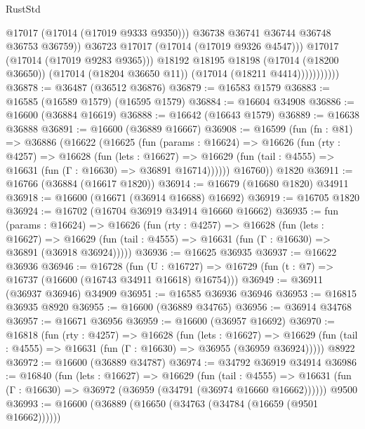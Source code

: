 \begin{lexlean}{RustStd}
\begin{coremodule}
{\begin{coremodule}
{{{{{{{{{{{{{{{{{{{{{{{{{{{{{{{{{{{{{{{{{{{{{{{{{{{{{{{                                @17017
                                (@17014 (@17019 @9333 @9350)))
                              @36738
                              @36741
                              @36744
                              @36748
                              @36753
                              @36759))
                          @36723
                          @17017
                          (@17014 (@17019 @9326 @4547)))
                        @17017
                        (@17014 (@17019 @9283 @9365)))
                      @18192
                      @18195
                      @18198
                      (@17014 (@18200 @36650))
                      (@17014 (@18204 @36650 @11))
                      (@17014 (@18211 @4414)))))))))))
@36878 := @36487 (@36512 @36876)
@36879 := @16583 @1579
@36883 := @16585 (@16589 @1579) (@16595 @1579)
@36884 := @16604 @34908
@36886 := @16600 (@36884 @16619)
@36888 := @16642 (@16643 @1579)
@36889 := @16638 @36888
@36891 := @16600 (@36889 @16667)
@36908 := @16599
    (fun (fn : @81) =>
    @36886
      (@16622
        (@16625
          (fun (params : @16624) =>
          @16626
            (fun (rty : @4257) =>
            @16628
              (fun (lets : @16627) =>
              @16629 (fun (tail : @4555) => @16631 (fun (Γ : @16630) => @36891 @16714))))))
        @16760))
    @1820
@36911 := @16766 (@36884 (@16617 @1820))
@36914 := @16679 (@16680 @1820) @34911
@36918 := @16600 (@16671 (@36914 @16688) @16692)
@36919 := @16705 @1820
@36924 := @16702 (@16704 @36919 @34914 @16660 @16662)
@36935 := fun (params : @16624) =>
  @16626
    (fun (rty : @4257) =>
    @16628
      (fun (lets : @16627) =>
      @16629 (fun (tail : @4555) => @16631 (fun (Γ : @16630) => @36891 (@36918 @36924)))))
@36936 := @16625 @36935
@36937 := @16622 @36936
@36946 := @16728
    (fun (U : @16727) => @16729 (fun (t : @7) => @16737 (@16600 (@16743 @34911 @16618) @16754)))
@36949 := @36911 (@36937 @36946) @34909
@36951 := @16585 @36936 @36946
@36953 := @16815 @36935 @8920
@36955 := @16600 (@36889 @34765)
@36956 := @36914 @34768
@36957 := @16671 @36956
@36959 := @16600 (@36957 @16692)
@36970 := @16818
    (fun (rty : @4257) =>
    @16628
      (fun (lets : @16627) =>
      @16629 (fun (tail : @4555) => @16631 (fun (Γ : @16630) => @36955 (@36959 @36924)))))
    @8922
@36972 := @16600 (@36889 @34787)
@36974 := @34792 @36919 @34914
@36986 := @16840
    (fun (lets : @16627) =>
    @16629
      (fun (tail : @4555) =>
      @16631 (fun (Γ : @16630) => @36972 (@36959 (@34791 (@36974 @16660 @16662))))))
    @9500
@36993 := @16600 (@36889 (@16650 (@34763 (@34784 (@16659 (@9501 @16662))))))
}}}}}}}}}}}}}}}}}}}}}}}}}}}}}}}}}}}}}}}}}}}}}}}}}}}}}}}
\end{coremodule}}
\end{coremodule}
\end{lexlean}
